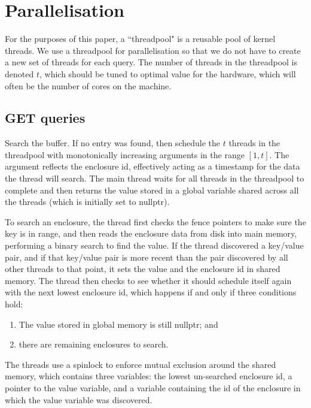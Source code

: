 \documentclass[format=acmtog, review=false]{acmart}
\begin{document}
\section{Parallelisation}

For the purposes of this paper, a ``threadpool" is a reusable pool of kernel threads. We use a threadpool for parallelisation so that we do not have to create a new set of threads for each query. The number of threads in the threadpool is denoted $t$, which should be tuned to optimal value for the hardware, which will often be the number of cores on the machine.

\subsection{GET queries}

Search the buffer. If no entry was found, then schedule the $t$ threads in the threadpool with monotonically increasing arguments in the range $[1, t]$. The argument reflects the enclosure id, effectively acting as a timestamp for the data the thread will search. The main thread waits for all threads in the threadpool to complete and then returns the value stored in a global variable shared across all the threads (which is initially set to nullptr).

To search an enclosure, the thread first checks the fence pointers to make sure the key is in range, and then reads the enclosure data from disk into main memory, performing a binary search to find the value. If the thread discovered a key/value pair, and if that key/value pair is more recent than the pair discovered by all other threads to that point, it sets the value and the enclosure id in shared memory. The thread then checks to see whether it should schedule itself again with the next lowest enclosure id, which happens if and only if three conditions hold:

\begin{enumerate} 
  \item The value stored in global memory is still nullptr; and
  \item there are remaining enclosures to search. 
\end{enumerate}

The threads use a spinlock to enforce mutual exclusion around the shared memory, which contains three variables: the lowest un-searched enclosure id, a pointer to the value variable, and a variable containing the id of the enclosure in which the value variable was discovered.
\end{document}
